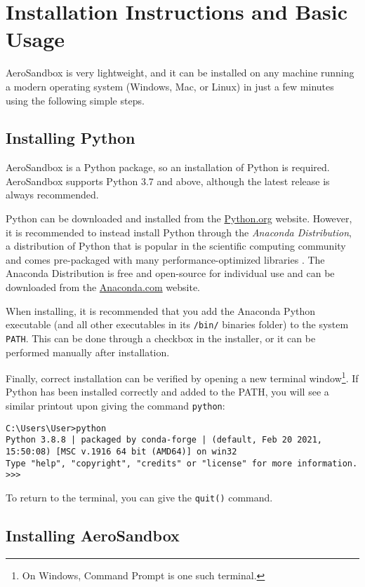 \chapter{Installation Instructions and Basic Usage}
\label{chapter:installation}

AeroSandbox is very lightweight, and it can be installed on any machine running a modern operating system (Windows, Mac, or Linux) in just a few minutes using the following simple steps.


\section{Installing Python}

AeroSandbox is a Python package, so an installation of Python is required. AeroSandbox supports Python 3.7 and above, although the latest release is always recommended.

Python can be downloaded and installed from the \url{Python.org} website. However, it is recommended to instead install Python through the \textit{Anaconda Distribution}, a distribution of Python that is popular in the scientific computing community and comes pre-packaged with many performance-optimized libraries \cite{anaconda}. The Anaconda Distribution is free and open-source for individual use and can be downloaded from the \url{Anaconda.com} website.

When installing, it is recommended that you add the Anaconda Python executable (and all other executables in its \texttt{/bin/} binaries folder) to the system \texttt{PATH}. This can be done through a checkbox in the installer, or it can be performed manually after installation.

Finally, correct installation can be verified by opening a new terminal window\footnote{On Windows, Command Prompt is one such terminal.}. If Python has been installed correctly and added to the PATH, you will see a similar printout upon giving the command \texttt{python}:

\begin{verbatim}
C:\Users\User>python
Python 3.8.8 | packaged by conda-forge | (default, Feb 20 2021, 15:50:08) [MSC v.1916 64 bit (AMD64)] on win32
Type "help", "copyright", "credits" or "license" for more information.
>>>
\end{verbatim}

To return to the terminal, you can give the \texttt{quit()} command.


\section{Installing AeroSandbox}

